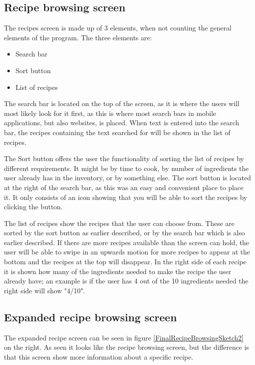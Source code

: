 \subsection{Recipe browsing screen}

The recipes screen is made up of 3 elements, when not counting the general elements of the program. The three elements are:

\begin{itemize}
    \item Search bar
    \item Sort button
    \item List of recipes
\end{itemize}

The search bar is located on the top of the screen, as it is where the users will most likely look for it first, as this is where most search bars in mobile applications, but also websites, is placed. When text is entered into the search bar, the recipes containing the text searched for will be shown in the list of recipes. 

The Sort button offers the user the functionality of sorting the list of recipes by different requirements. It might be by time to cook, by number of ingredients the user already has in the inventory, or by something else. The sort button is located at the right of the search bar, as this was an easy and convenient place to place it. It only consists of an icon showing that you will be able to sort the recipes by clicking the button.

The list of recipes show the recipes that the user can choose from. These are sorted by the sort button as earlier described, or by the search bar which is also earlier described. If there are more recipes available than the screen can hold, the user will be able to swipe in an upwards motion for more recipes to appear at the bottom and the recipes at the top will disappear. In the right side of each recipe it is shown how many of the ingredients needed to make the recipe the user already have; an example is if the user has 4 out of the 10 ingredients needed the right side will show "4/10".

\subsection{Expanded recipe browsing screen}

The expanded recipe screen can be seen in figure \ref{FinalRecipeBrowsingSketch2} on the right. As seen it looks like the recipe browsing screen, but the difference is that this screen show more information about a specific recipe.

